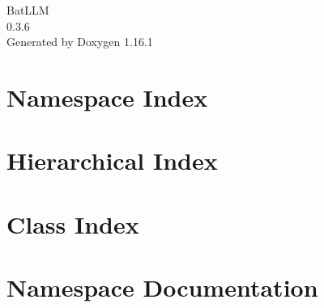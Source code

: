 \documentclass[twoside]{book}
\newcommand{\+}{\discretionary{\mbox{\scriptsize$\hookleftarrow$}}{}{}}
\newcommand{\clearemptydoublepage}{%
    \newpage{\pagestyle{empty}\cleardoublepage}%
  }
\begin{document}
  \raggedbottom
    \hypersetup{pageanchor=false,
                bookmarksnumbered=true,
                pdfencoding=unicode
               }
  \begin{titlepage}
  \vspace*{7cm}
  \begin{center}%
  {\Large Bat\+LLM}\\
  [1ex]\large 0.\+3.\+6 \\
  \vspace*{1cm}
  {\large Generated by Doxygen 1.16.1}\\
  \end{center}
  \end{titlepage}
  \clearemptydoublepage
  \tableofcontents
  \clearemptydoublepage
  \hypersetup{pageanchor=true}
\chapter{Namespace Index}

\chapter{Hierarchical Index}

\chapter{Class Index}

\chapter{Namespace Documentation}
























\end{document}
